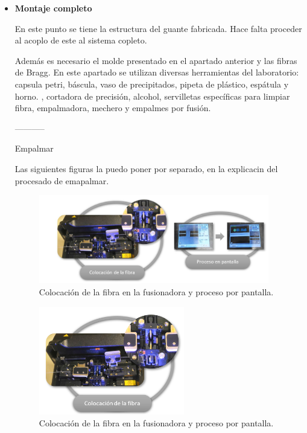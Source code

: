 \begin{itemize}
	
	
	

	
	
	\item \textbf{Montaje completo}
	
	En este punto se tiene la estructura del guante fabricada. Hace falta proceder al acoplo de este al sistema copleto.
	
	
		Además es necesario el molde presentado en el apartado anterior y las fibras de Bragg. En este apartado se utilizan diversas herramientas del laboratorio: capsula petri, báscula, vaso de precipitados, pipeta de plástico, espátula y  horno. , cortadora de precisión, alcohol, servilletas específicas para limpiar fibra, empalmadora, mechero y empalmes por fusión.
	
	
	
	-----------
	
	
	Empalmar
	
	\textcolor{rositaoscuro}{Las siguientes figuras la puedo poner por separado, en la explicacin del procesado de emapalmar.}
	\begin{figure}[H]
		\centering
		\includegraphics[width=0.95\textwidth]{./img/fusionFOpractica}
		\caption{Colocación de la fibra en la fusionadora y proceso por pantalla.} 
		\label{fig:fusionadora}
	\end{figure}  
	
	\begin{figure}[H]
		\centering
		\includegraphics[width=0.6\textwidth]{./img/colocacionFibra}
		\caption{Colocación de la fibra en la fusionadora y proceso por pantalla. }
		\label{fig:colocacionFibra}
	\end{figure}  
	

\end{itemize}
